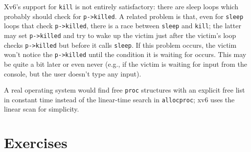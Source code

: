 Xv6's support for
\lstinline{kill}
is not entirely satisfactory: there are sleep loops
which probably should check for
\lstinline{p->killed}.
A related problem is that, even for 
\lstinline{sleep}
loops that check
\lstinline{p->killed},
there is a race between 
\lstinline{sleep}
and
\lstinline{kill};
the latter may set
\lstinline{p->killed}
and try to wake up the victim just after the victim's loop
checks
\lstinline{p->killed}
but before it calls
\lstinline{sleep}.
If this problem occurs, the victim won't notice the
\lstinline{p->killed}
until the condition it is waiting for occurs. This may be quite a bit later
or even never
(e.g., if the victim is waiting for input from the console, but the user
doesn't type any input).

A real operating system would find free
\lstinline{proc}
structures with an explicit free list
in constant time instead of the linear-time search in
\lstinline{allocproc};
xv6 uses the linear scan for simplicity.
\section{Exercises}

